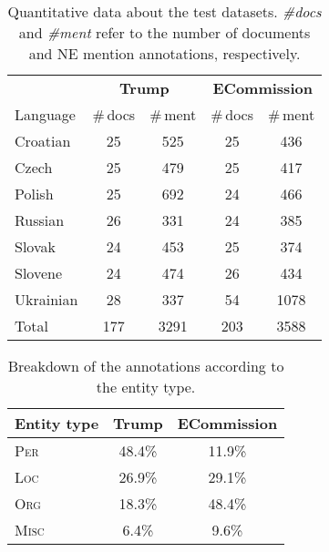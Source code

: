 \documentclass[11pt]{article}
\begin{document}
\begin{table}
  \begin{center}
    \begin{footnotesize}
      \begin{tabular}{lcccc}
        \toprule 
        & \multicolumn{2}{c}{\textbf{{\sc Trump}}} & \multicolumn{2}{c}{\textbf{{\sc ECommission}}} \\
        \cmidrule(lr){2-3}
        \cmidrule(lr){4-5}
        Language &  \#\,docs & \#\,ment & \#\,docs & \#\,ment \\
        \midrule
        Croatian & 25 & 525 & 25 & 436 \\
        Czech & 25 & 479  & 25 & 417 \\
        Polish & 25 & 692  & 24 & 466 \\
        Russian & 26 & 331  & 24 & 385 \\
        Slovak  & 24 & 453  & 25 & 374 \\
        Slovene & 24 & 474  & 26 & 434 \\
        Ukrainian & 28 & 337  & 54 & 1078 \\
        \midrule
        Total & 177 & 3291  & 203 & 3588 \\

        \bottomrule
      \end{tabular}
    \end{footnotesize}
  \end{center}
  \caption{Quantitative data about the test datasets. {\em \#docs} and {\em \#ment} refer to
    the number of documents and NE mention annotations, respectively.} 
  \label{tab:datasets}
\end{table}

\begin{table}
  \begin{center}
    \begin{footnotesize}
      \begin{tabular}{lcc}
        \toprule 
        Entity type & {\textbf{{\sc Trump}}} & {\textbf{{\sc ECommission}}} \\
        \midrule
	\textsc{Per} & 48.4\% & 11.9\% \\
	\textsc{Loc} & 26.9\% & 29.1\% \\
	\textsc{Org} & 18.3\% & 48.4\% \\
	\textsc{Misc} & \phantom{0}6.4\% & \phantom{0}9.6\% \\
        \bottomrule
      \end{tabular}
    \end{footnotesize}
  \end{center}
  \caption{Breakdown of the annotations according to the entity type.}
  \label{tab:datasets-2}
\end{table}
\end{document}
